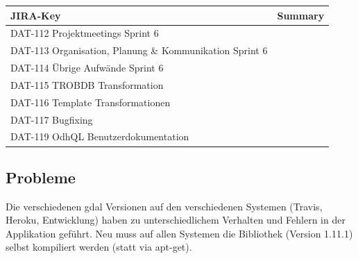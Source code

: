 \begin{table}[H]	
\centering
\begin{tabular}{ll}
	\toprule
	\textbf{JIRA-Key} & \textbf{Summary}\\
	\midrule
DAT-112	Projektmeetings Sprint 6\\
DAT-113	Organisation, Planung \& Kommunikation Sprint 6\\
DAT-114	Übrige Aufwände Sprint 6\\
DAT-115	TROBDB Transformation\\
DAT-116	Template Transformationen\\
DAT-117	Bugfixing\\
DAT-119	OdhQL Benutzerdokumentation\\
	\bottomrule
\end{tabular}	
\end{table}

\subsection{Probleme}
Die verschiedenen \acs{gdal} Versionen auf den verschiedenen Systemen (Travis, Heroku, Entwicklung) haben zu unterschiedlichem Verhalten und Fehlern in der Applikation geführt. Neu muss auf allen Systemen die Bibliothek (Version 1.11.1) selbst kompiliert werden (statt via apt-get).